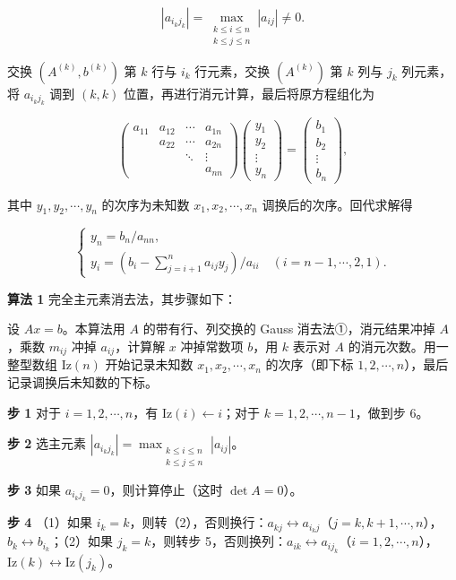 \documentclass[
  10pt,
  fontset=fandol]{ctexart}
\begin{document}
\[|a_{i_kj_k}|=\max_{\substack{k\le i\le n\\k\le j\le n}}|a_{ij}|\ne0.\]

交换 \((A^{(k)},b^{(k)})\) 第 \(k\) 行与 \(i_k\) 行元素，交换 \((A^{(k)})\) 第 \(k\) 列与 \(j_k\) 列元素，将 \(a_{i_kj_k}\) 调到 \((k,k)\) 位置，再进行消元计算，最后将原方程组化为

\[
\begin{pmatrix}
a_{11}&a_{12}&\cdots&a_{1n}\\
&a_{22}&\cdots&a_{2n}\\
&&\ddots&\vdots\\
&&&a_{nn}
\end{pmatrix}
\begin{pmatrix}y_1\\y_2\\\vdots\\y_n\end{pmatrix}
=\begin{pmatrix}b_1\\b_2\\\vdots\\b_n\end{pmatrix},
\]

其中 \(y_1,y_2,\cdots,y_n\) 的次序为未知数 \(x_1,x_2,\cdots,x_n\) 调换后的次序。回代求解得

\[
\begin{cases}
y_n=b_n/a_{nn},\\
y_i=\displaystyle\left(b_i-\sum_{j=i+1}^{n}a_{ij}y_j\right)/a_{ii}\quad(i=n-1,\cdots,2,1).
\end{cases}
\]

\textbf{算法 1} 完全主元素消去法，其步骤如下：

设 \(Ax=b\)。本算法用 \(A\) 的带有行、列交换的 Gauss 消去法①，消元结果冲掉 \(A\)，乘数 \(m_{ij}\) 冲掉 \(a_{ij}\)，计算解 \(x\) 冲掉常数项 \(b\)，用 \(k\) 表示对 \(A\) 的消元次数。用一整型数组 \(\mathrm{Iz}(n)\) 开始记录未知数 \(x_1,x_2,\cdots,x_n\) 的次序（即下标 \(1,2,\cdots,n\)），最后记录调换后未知数的下标。

\textbf{步 1} 对于 \(i=1,2,\cdots,n\)，有 \(\mathrm{Iz}(i)\leftarrow i\)；对于 \(k=1,2,\cdots,n-1\)，做到步 6。

\textbf{步 2} 选主元素 \(|a_{i_kj_k}|=\max_{\substack{k\le i\le n\\k\le j\le n}}|a_{ij}|\)。

\textbf{步 3} 如果 \(a_{i_kj_k}=0\)，则计算停止（这时 \(\det A=0\)）。

\textbf{步 4} （1）如果 \(i_k=k\)，则转（2），否则换行：\(a_{kj}\leftrightarrow a_{i_kj}\)（\(j=k,k+1,\cdots,n\)），\(b_k\leftrightarrow b_{i_k}\)；（2）如果 \(j_k=k\)，则转步 5，否则换列：\(a_{ik}\leftrightarrow a_{ij_k}\)（\(i=1,2,\cdots,n\)），\(\mathrm{Iz}(k)\leftrightarrow\mathrm{Iz}(j_k)\)。
\end{document}

